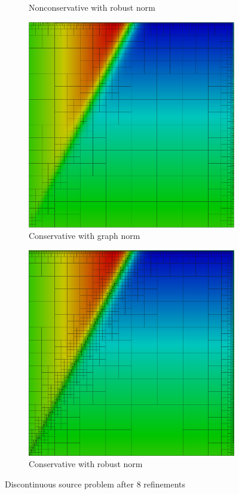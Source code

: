 \documentclass[letterpaper]{article}
\begin{document}
\begin{figure}
\begin{subfigure}[t]{0.45\textwidth}
\caption{Nonconservative with robust norm}
\label{fig:discontinuousRobust8nc}
\end{subfigure}
\begin{subfigure}[t]{0.45\textwidth}
\centering
\includegraphics[width=\textwidth]{figs/Discontinuous/graph8c.png}
\caption{Conservative with graph norm}
\label{fig:discontinuousGraph8c}
\end{subfigure}
\begin{subfigure}[t]{0.45\textwidth}
\centering
\includegraphics[width=\textwidth]{figs/Discontinuous/robust8c.png}
\caption{Conservative with robust norm}
\label{fig:discontinuousRobust8c}
\end{subfigure}
\caption{Discontinuous source problem after 8 refinements}
\label{fig:discontinuous}
\end{figure}
\end{document}
